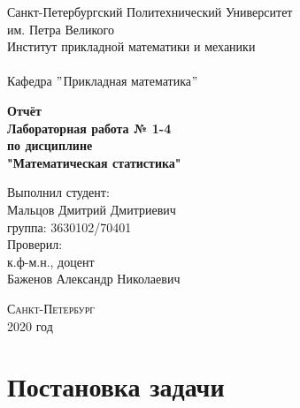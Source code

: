 \documentclass[a4]{article}
\begin{document}
	\def\contentsname{\LARGE{Содержание}}
	\thispagestyle{empty}
	\begin{center} 
		\vspace{2cm} 
		{\Large \sc Санкт-Петербургский Политехнический Университет}\\
		\vspace{2mm}
		{\Large\sc им. Петра Великого}\\
		\vspace{1cm}
		{\large \sc Институт прикладной математики и механики\\ 
			\vspace{0.5mm}
			\textsc{}}\\ 
		\vspace{0.5mm}
		{\large\sc Кафедра $"$Прикладная математика$"$}\\
		\vspace{15mm}
		
		
		{\sc \textbf{Отчёт\\
			Лабораторная работа № 1-4\\
			по дисциплине\\
			"Математическая статистика"}
			\vspace{6mm}
			
		}
		\vspace*{2mm}
		
		
		\begin{flushleft}
			\vspace{4cm}
			\sc Выполнил студент:\\
			\sc Мальцов Дмитрий Дмитриевич\\
			\sc группа: 3630102/70401\\
			\vspace{1cm}
			\sc Проверил:\\
			\sc к.ф-м.н., доцент\\
			\sc Баженов Александр Николаевич
			\vspace{20mm}
		\end{flushleft}
	\end{center} 
	\begin{center}
		\vfill {\large\textsc{Санкт-Петербург}}\\ 
		2020 год
	\end{center}
	
	\newpage
	\pagestyle{plain}
	
	
	\newpage
	\tableofcontents{}
	\newpage
	\listoffigures
	\newpage
	\listoftables
	\newpage
	
	
	\section{Постановка задачи}
	
\end{document}
